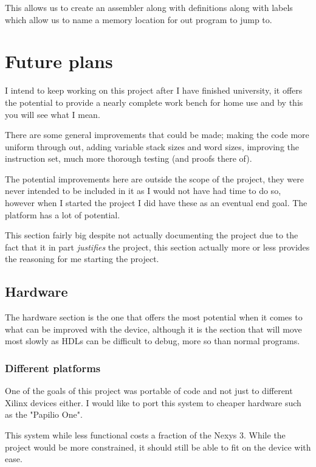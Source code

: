 \documentclass	[a4paper, 10pt]	{article}
\newcommand{\findcite}[1]{
  \par
  \begin{center}
  \framebox[\textwidth]{
    \textcolor{red}{\emph{Find Citation on:} \textsc{#1}}
  }
  \end{center}
  \par
}
\begin{document}
    This allows us to create an assembler along with definitions along with labels
    which allow us to name a memory location for out program to jump to.

   \section{Future plans}
    \label{sec:futurePlans}

    I intend to keep working on this project after I have finished university, it offers the
    potential to provide a nearly complete work bench for home use and by this you will see
    what I mean.

    There are some general improvements that could be made; making the code more uniform
    through out, adding variable stack sizes and word sizes, improving the instruction set,
    much more thorough testing (and proofs there of).

    The potential improvements here are outside the scope of the project, they were never
    intended to be included in it as I would not have had time to do so, however when I
    started the project I did have these as an eventual end goal. The platform has a lot of
    potential.

    This section fairly big despite not actually documenting the project due to the fact
    that it in part \emph{justifies} the project, this section actually more or less provides
    the reasoning for me starting the project.

    \subsection{Hardware}

      The hardware section is the one that offers the most potential when it comes to
      what can be improved with the device, although it is the section that will move
      most slowly as HDLs can be difficult to debug, more so than normal programs.

      \subsubsection{Different platforms}
      One of the goals of this project was portable of code and not just to different
      Xilinx devices either. I would like to port this system to cheaper hardware
      such as the "Papilio One". \findcite{http://papilio.cc/} This system while less
      functional costs a fraction of the Nexys 3. While the project would be more
      constrained, it should still be able to fit on the device with ease.
\end{document}
